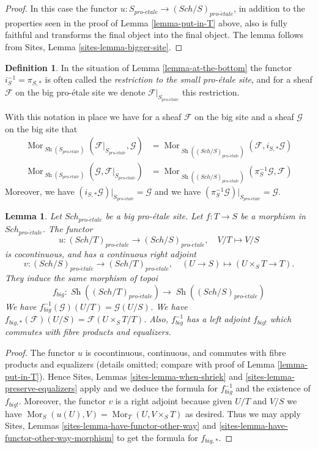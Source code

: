 \documentclass{stacks-project}
\theoremstyle{plain}
\newtheorem{lemma}[subsection]{Lemma}
\theoremstyle{definition}
\newtheorem{definition}[subsection]{Definition}
\theoremstyle{remark}
\numberwithin{equation}{subsection}
\def\Sch{\mathit{Sch}}
\def\Mor{\mathop{\mathrm{Mor}}\nolimits}
\def\Sh{\mathop{\mathit{Sh}}\nolimits}
\def\proetale{{pro\text{-}\acute{e}tale}}
\begin{document}
\begin{proof}
In this case the functor $u : S_\proetale \to (\Sch/S)_\proetale$,
in addition to the properties seen in the proof of
Lemma \ref{lemma-put-in-T} above, also is fully faithful
and transforms the final object into the final object.
The lemma follows from Sites, Lemma \ref{sites-lemma-bigger-site}.
\end{proof}

\begin{definition}
\label{definition-restriction-small-proetale}
In the situation of
Lemma \ref{lemma-at-the-bottom}
the functor $i_S^{-1} = \pi_{S, *}$ is often
called the {\it restriction to the small pro-\'etale site}, and for a sheaf
$\mathcal{F}$ on the big pro-\'etale site we denote
$\mathcal{F}|_{S_\proetale}$ this restriction.
\end{definition}

\noindent
With this notation in place we have for a sheaf $\mathcal{F}$ on the
big site and a sheaf $\mathcal{G}$ on the big site that
\begin{align*}
\Mor_{\Sh(S_\proetale)}(\mathcal{F}|_{S_\proetale}, \mathcal{G})
& =
\Mor_{\Sh((\Sch/S)_\proetale)}(\mathcal{F},
i_{S, *}\mathcal{G}) \\
\Mor_{\Sh(S_\proetale)}(\mathcal{G}, \mathcal{F}|_{S_\proetale})
& =
\Mor_{\Sh((\Sch/S)_\proetale)}(\pi_S^{-1}\mathcal{G}, \mathcal{F})
\end{align*}
Moreover, we have $(i_{S, *}\mathcal{G})|_{S_\proetale} = \mathcal{G}$
and we have $(\pi_S^{-1}\mathcal{G})|_{S_\proetale} = \mathcal{G}$.

\begin{lemma}
\label{lemma-morphism-big}
Let $\Sch_\proetale$ be a big pro-\'etale site.
Let $f : T \to S$ be a morphism in $\Sch_\proetale$.
The functor
$$
u : (\Sch/T)_\proetale \longrightarrow (\Sch/S)_\proetale, \quad
V/T \longmapsto V/S
$$
is cocontinuous, and has a continuous right adjoint
$$
v : (\Sch/S)_\proetale \longrightarrow (\Sch/T)_\proetale, \quad
(U \to S) \longmapsto (U \times_S T \to T).
$$
They induce the same morphism of topoi
$$
f_{big} :
\Sh((\Sch/T)_\proetale)
\longrightarrow
\Sh((\Sch/S)_\proetale)
$$
We have $f_{big}^{-1}(\mathcal{G})(U/T) = \mathcal{G}(U/S)$.
We have $f_{big, *}(\mathcal{F})(U/S) = \mathcal{F}(U \times_S T/T)$.
Also, $f_{big}^{-1}$ has a left adjoint $f_{big!}$ which commutes with
fibre products and equalizers.
\end{lemma}

\begin{proof}
The functor $u$ is cocontinuous, continuous, and commutes with fibre products
and equalizers (details omitted; compare with proof of
Lemma \ref{lemma-put-in-T}). Hence
Sites, Lemmas \ref{sites-lemma-when-shriek} and
\ref{sites-lemma-preserve-equalizers}
apply and we deduce the formula
for $f_{big}^{-1}$ and the existence of $f_{big!}$. Moreover,
the functor $v$ is a right adjoint because given $U/T$ and $V/S$
we have $\Mor_S(u(U), V) = \Mor_T(U, V \times_S T)$
as desired. Thus we may apply
Sites, Lemmas \ref{sites-lemma-have-functor-other-way} and
\ref{sites-lemma-have-functor-other-way-morphism}
to get the formula for $f_{big, *}$.
\end{proof}
\end{document}

